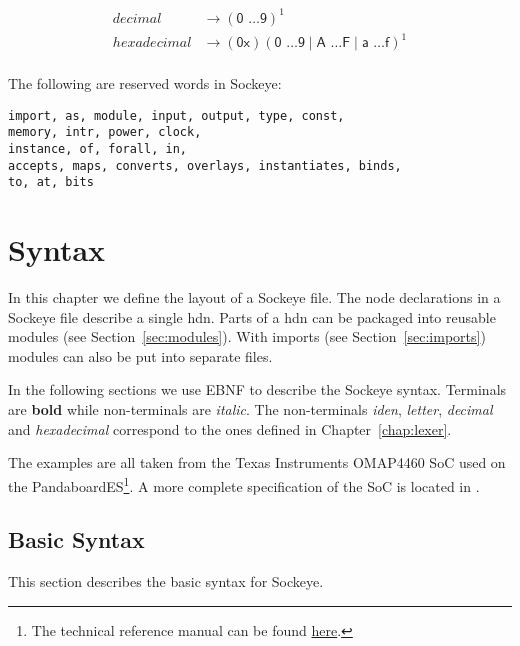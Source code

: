 \documentclass[a4paper,11pt,twoside]{report}
\begin{document}
{{{\begin{description}
\begin{align*}
decimal & \rightarrow (\textsf{0 \ldots 9})^{\textrm{1}}\\
hexadecimal & \rightarrow (\textsf{0x})(\textsf{0 \ldots 9} \mid \textsf{A \ldots F} \mid \textsf{a \ldots f})^{\textrm{1}}\\
\end{align*}

\item[Reserved words:] The following are reserved words in Sockeye:
\begin{verbatim}
import, as, module, input, output, type, const,
memory, intr, power, clock,
instance, of, forall, in,
accepts, maps, converts, overlays, instantiates, binds,
to, at, bits
\end{verbatim}

\end{description}

\chapter{Syntax}
\label{chap:declaration}

In this chapter we define the layout of a Sockeye file.
The node declarations in a Sockeye file describe a single \gls{hdn}.
Parts of a \gls{hdn} can be packaged into reusable modules (see Section~\ref{sec:modules}).
With imports (see Section~\ref{sec:imports}) modules can also be put into separate files.

In the following sections we use EBNF to describe the Sockeye syntax. Terminals are \textbf{bold} while non-terminals are \textit{italic}.
The non-terminals \textit{iden}, \textit{letter}, \textit{decimal} and \textit{hexadecimal} correspond to the ones defined in Chapter~\ref{chap:lexer}.

The examples are all taken from the Texas Instruments OMAP4460 SoC used on the PandaboardES\footnote{The technical reference manual can be found \href{http://www.
ti.com/lit/ug/swpu235ab/swpu235ab.pdf}{here}.}.
A more complete specification of the SoC is located in .

\section{Basic Syntax}
This section describes the basic syntax for Sockeye.


}}}
\end{document}
